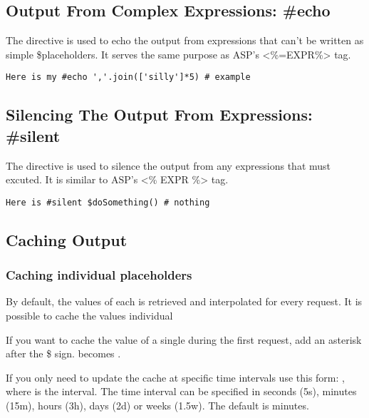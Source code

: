 \subsection{Output From Complex Expressions: \#echo}
\label{TDL.echo}

The  directive is used to echo the output from expressions that
can't be written as simple \$placeholders.  It serves the same purpose as ASP's
<\%=EXPR\%> tag.

\begin{verbatim}
Here is my #echo ','.join(['silly']*5) # example 
\end{verbatim}


\subsection{Silencing The Output From Expressions: \#silent}
\label{output.silent}

The  directive is used to silence the output from any expressions that
must excuted.  It is similar to ASP's <\% EXPR \%> tag.

\begin{verbatim}
Here is #silent $doSomething() # nothing
\end{verbatim}


\subsection{Caching Output}
\label{output.caching}

\subsubsection{Caching individual placeholders}
\label{output.caching.placeholders}

By default, the values of each  is retrieved and
interpolated for every request. It is possible to cache the values individual
                         
If you want to cache the value of a single  during the first
request, add an asterisk after the \$ sign.   becomes .

If you only need to update the cache at specific time intervals use this form:
 , where  is the interval.  The
time interval can be specified in seconds (5s), minutes (15m), hours (3h), days
(2d) or weeks (1.5w). The default is minutes.

